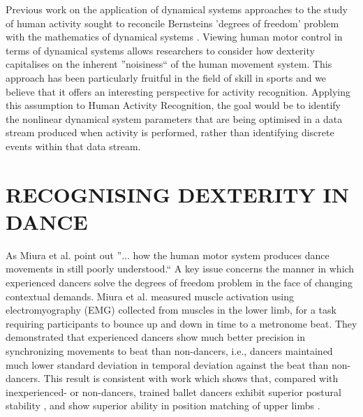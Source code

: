 \documentclass{sigchi}
\begin{document}
Previous work on the application of dynamical systems approaches to the study of human activity sought to 
reconcile Bernsteins  \cite{Bernstein1967} 'degrees of freedom' problem with the mathematics 
of dynamical systems \cite{Kugler1982}.
Viewing human motor control in terms of 
dynamical systems allows researchers to consider how dexterity capitalises on the inherent ''noisiness`` of the human 
movement system. This approach has been particularly fruitful in the field of skill in sports \cite{Davids2003}
and we believe that it offers an interesting perspective for activity recognition. 
Applying this assumption to Human Activity Recognition, the goal would be to identify 
the nonlinear dynamical system parameters that are being 
optimised in a data stream produced when activity is performed, rather than identifying 
discrete events within that data stream. 
 

\section{RECOGNISING DEXTERITY IN DANCE }
As Miura et al. \cite{Miura2015} point out ''$\ldots$ how the human motor system produces dance movements in still 
poorly understood.`` A key issue concerns the manner in which experienced dancers solve the degrees of freedom 
problem in the face of changing contextual demands.  Miura et al. \cite{Miura2013} measured muscle activation 
using electromyography (EMG) collected from muscles in the lower limb, for a task requiring participants to 
bounce up and down in time to a metronome beat.  They demonstrated that experienced dancers show much better 
precision in synchronizing movements to beat than non-dancers, i.e., dancers maintained much lower standard 
deviation in temporal deviation against the beat than non-dancers. This result is consistent with work which 
shows that, compared with inexperienced- or non-dancers, trained ballet dancers exhibit superior postural 
stability \cite{Crotts1996} %
, and show superior ability in position matching of upper limbs \cite{Ramsay2001}.%
\end{document}

